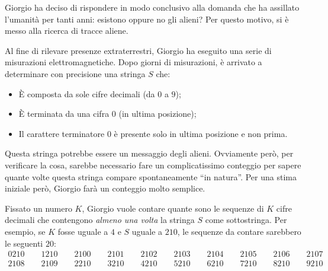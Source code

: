\usepackage{xcolor}
\usepackage{afterpage}
\usepackage{pifont,mdframed}
\usepackage[bottom]{footmisc}

\makeatletter
\gdef\this@inputfilename{input.txt}
\gdef\this@outputfilename{output.txt}
\makeatother

\newcommand{\inputfile}{\texttt{input.txt}}
\newcommand{\outputfile}{\texttt{output.txt}}

\newenvironment{warning}
  {\par\begin{mdframed}[linewidth=2pt,linecolor=gray]%
    \begin{list}{}{\leftmargin=1cm
                   \labelwidth=\leftmargin}\item[\Large\ding{43}]}
  {\end{list}\end{mdframed}\par}

Giorgio ha deciso di rispondere in modo conclusivo alla domanda che ha assillato l'umanità per tanti anni: esistono oppure no gli alieni? Per questo motivo, si è messo alla ricerca di tracce aliene.

Al fine di rilevare presenze extraterrestri, Giorgio ha eseguito una serie di misurazioni elettromagnetiche. Dopo giorni di misurazioni, è arrivato a determinare con precisione una stringa $S$ che:

\begin{itemize}
  \item È composta da sole cifre decimali (da $0$ a $9$);
  \item È terminata da una cifra $0$ (in ultima posizione);
  \item Il carattere terminatore $0$ è presente solo in ultima posizione e non prima.
\end{itemize}

Questa stringa potrebbe essere un messaggio degli alieni. Ovviamente però, per verificare la cosa, sarebbe necessario fare un complicatissimo conteggio per sapere quante volte questa stringa compare spontaneamente ``in natura''. Per una stima iniziale però, Giorgio farà un conteggio molto semplice.

Fissato un numero $K$, Giorgio vuole contare quante sono le sequenze di $K$ cifre decimali che contengono \emph{almeno una volta} la stringa $S$ come sottostringa. Per esempio, se $K$ fosse uguale a $4$ e $S$ uguale a $210$, le sequenze da contare sarebbero le seguenti $20$:
\begin{align*}
  0210 \qquad 1210 \qquad 2100 \qquad 2101 \qquad 2102 \qquad 2103 \qquad 2104 \qquad 2105 \qquad 2106 \qquad 2107 \\
  2108 \qquad 2109 \qquad 2210 \qquad 3210 \qquad 4210 \qquad 5210 \qquad 6210 \qquad 7210 \qquad 8210 \qquad 9210
\end{align*}

